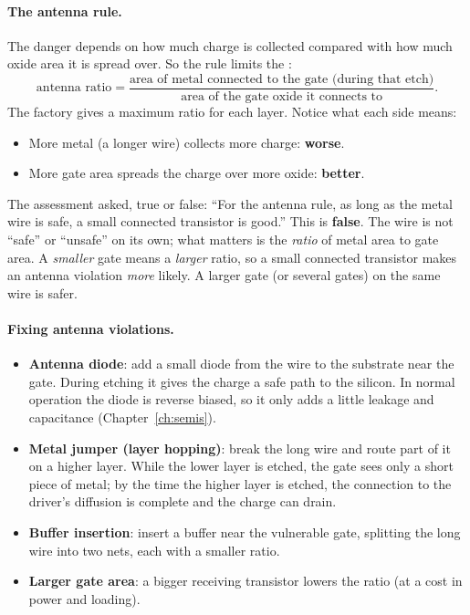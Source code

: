 \paragraph{The antenna rule.} The danger depends on how much charge is collected compared with how much oxide area it is spread over. So the rule limits the :
\[
  \text{antenna ratio} = \frac{\text{area of metal connected to the gate (during that etch)}}{\text{area of the gate oxide it connects to}}.
\]
The factory gives a maximum ratio for each layer. Notice what each side means:
\begin{itemize}
  \item More metal (a longer wire) collects more charge: \textbf{worse}.
  \item More gate area spreads the charge over more oxide: \textbf{better}.
\end{itemize}

\begin{onoa}
The assessment asked, true or false: ``For the antenna rule, as long as the metal wire is safe, a small connected transistor is good.'' This is \textbf{false}. The wire is not ``safe'' or ``unsafe'' on its own; what matters is the \emph{ratio} of metal area to gate area. A \emph{smaller} gate means a \emph{larger} ratio, so a small connected transistor makes an antenna violation \emph{more} likely. A larger gate (or several gates) on the same wire is safer.
\end{onoa}

\paragraph{Fixing antenna violations.}
\begin{itemize}
  \item \textbf{Antenna diode}: add a small diode from the wire to the substrate near the gate. During etching it gives the charge a safe path to the silicon. In normal operation the diode is reverse biased, so it only adds a little leakage and capacitance (Chapter~\ref{ch:semis}).
  \item \textbf{Metal jumper (layer hopping)}: break the long wire and route part of it on a higher layer. While the lower layer is etched, the gate sees only a short piece of metal; by the time the higher layer is etched, the connection to the driver's diffusion is complete and the charge can drain.
  \item \textbf{Buffer insertion}: insert a buffer near the vulnerable gate, splitting the long wire into two nets, each with a smaller ratio.
  \item \textbf{Larger gate area}: a bigger receiving transistor lowers the ratio (at a cost in power and loading).
\end{itemize}

